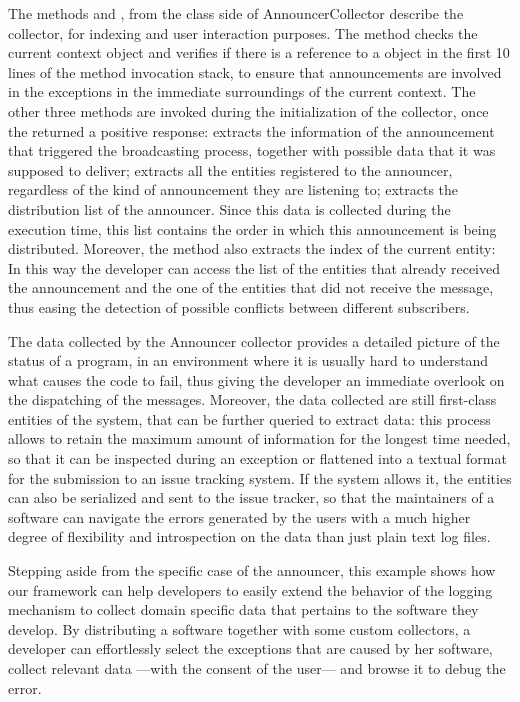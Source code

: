 The methods  and , from the class side of AnnouncerCollector describe the collector, for indexing and user interaction purposes.
The method  checks the current context object and verifies if there is a reference to a  object in the first 10 lines of the method invocation stack, to ensure that announcements are involved in the exceptions in the immediate surroundings of the current context.
The other three methods are invoked during the initialization of the collector, once the  returned a positive response:
 extracts the information of the announcement that triggered the broadcasting process, together with possible data that it was supposed to deliver;
 extracts all the entities registered to the announcer, regardless of the kind of announcement they are listening to;
 extracts the distribution list of the announcer.
Since this data is collected during the execution time, this list contains the order in which this announcement is being distributed.
Moreover, the method also extracts the index of the current entity: In this way the developer can access the list of the entities that already received the announcement and the one of the entities that did not receive the message, thus easing the detection of possible conflicts between different subscribers.

The data collected by the Announcer collector provides a detailed picture of the status of a program, in an environment where it is usually hard to understand what causes the code to fail, thus giving the developer an immediate overlook on the dispatching of the messages.
Moreover, the data collected are still first-class entities of the system, that can be further queried to extract data: this process allows to retain the maximum amount of information for the longest time needed, so that it can be inspected during an exception or flattened into a textual format for the submission to an issue tracking system.
If the system allows it, the entities can also be serialized and sent to the issue tracker, so that the maintainers of a software can navigate the errors generated by the users with a much higher degree of flexibility and introspection on the data than just plain text log files.

Stepping aside from the specific case of the announcer, this example shows how our framework can help developers to easily extend the behavior of the logging mechanism to collect domain specific data that pertains to the software they develop.
By distributing a software together with some custom collectors, a developer can effortlessly select the exceptions that are caused by her software, collect relevant data ---with the consent of the user--- and browse it to debug the error.

